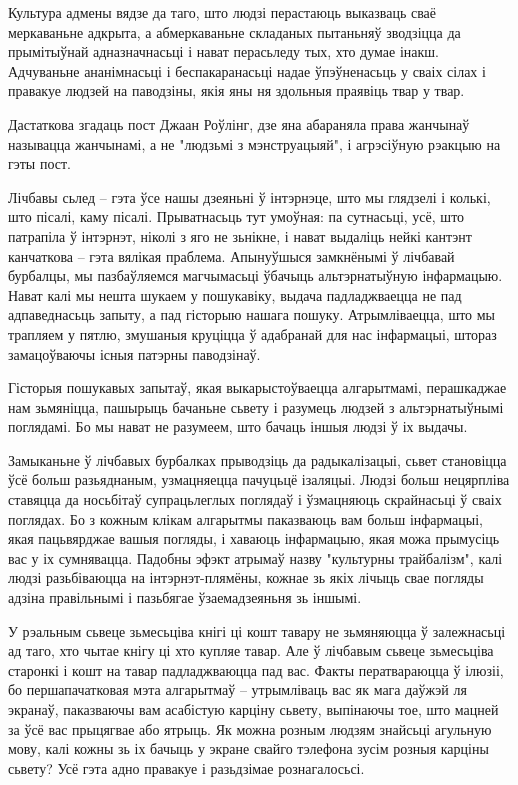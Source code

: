 Культура адмены вядзе да таго, што людзі перастаюць выказваць сваё меркаваньне адкрыта, а абмеркаваньне складаных пытаньняў зводзіцца да прымітыўнай адназначнасьці і нават перасьледу тых, хто думае інакш. Адчуваньне ананімнасьці і беспакаранасьці надае ўпэўненасьць у сваіх сілах і правакуе людзей на паводзіны, якія яны ня здольныя праявіць твар у твар.

Дастаткова згадаць пост Джаан Роўлінг, дзе яна абараняла права жанчынаў называцца жанчынамі, а не "людзьмі з мэнструацыяй", і агрэсіўную рэакцыю на гэты пост.

Лічбавы сьлед – гэта ўсе нашы дзеяньні ў інтэрнэце, што мы глядзелі і колькі, што пісалі, каму пісалі. Прыватнасьць тут умоўная: па сутнасьці, усё, што патрапіла ў інтэрнэт, ніколі з яго не зьнікне, і нават выдаліць нейкі кантэнт канчаткова – гэта вялікая праблема. Апынуўшыся замкнёнымі ў лічбавай бурбалцы, мы пазбаўляемся магчымасьці ўбачыць альтэрнатыўную інфармацыю. Нават калі мы нешта шукаем у пошукавіку, выдача падладжваецца не пад адпаведнасьць запыту, а пад гісторыю нашага пошуку. Атрымліваецца, што мы трапляем у пятлю, змушаныя круціцца ў адабранай для нас інфармацыі, штораз замацоўваючы існыя патэрны паводзінаў. 

Гісторыя пошукавых запытаў, якая выкарыстоўваецца алгарытмамі, перашкаджае нам зьмяніцца, пашырыць бачаньне сьвету і разумець людзей з альтэрнатыўнымі поглядамі. Бо мы нават не разумеем, што бачаць іншыя людзі ў іх выдачы.

Замыканьне ў лічбавых бурбалках прыводзіць да радыкалізацыі, сьвет становіцца ўсё больш разьяднаным, узмацняецца пачуцьцё ізаляцыі. Людзі больш нецярпліва ставяцца да носьбітаў супрацьлеглых поглядаў і ўзмацняюць скрайнасьці ў сваіх поглядах. Бо з кожным клікам алгарытмы паказваюць вам больш інфармацыі, якая пацьвярджае вашыя погляды, і хаваюць інфармацыю, якая можа прымусіць вас у іх сумнявацца. Падобны эфэкт атрымаў назву "культурны трайбалізм", калі людзі разьбіваюцца на інтэрнэт-плямёны, кожнае зь якіх лічыць свае погляды адзіна правільнымі і пазьбягае ўзаемадзеяньня зь іншымі.

У рэальным сьвеце зьмесьціва кнігі ці кошт тавару не зьмяняюцца ў залежнасьці ад таго, хто чытае кнігу ці хто купляе тавар. Але ў лічбавым сьвеце зьмесьціва старонкі і кошт на тавар падладжваюцца пад вас. Факты ператвараюцца ў ілюзіі, бо першапачатковая мэта алгарытмаў – утрымліваць вас як мага даўжэй ля экранаў, паказваючы вам асабістую карціну сьвету, выпінаючы тое, што мацней за ўсё вас прыцягвае або ятрыць. Як можна розным людзям знайсьці агульную мову, калі кожны зь іх бачыць у экране свайго тэлефона зусім розныя карціны сьвету? Усё гэта адно правакуе і разьдзімае рознагалосьсі.

